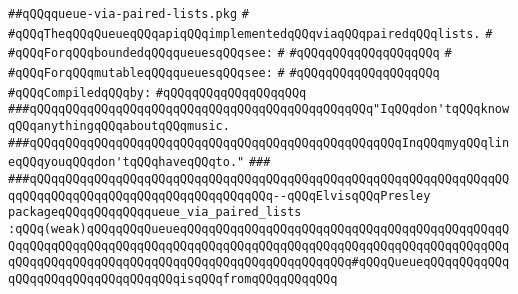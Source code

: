 \label{src/lib/src/queue-via-paired-lists.pkg}
\verb|##qQQqqueue-via-paired-lists.pkg|\newline
\verb|#|\newline
\verb|#qQQqTheqQQqQueueqQQqapiqQQqimplementedqQQqviaqQQqpairedqQQqlists.|\newline
\verb|#|\newline
\verb|#qQQqForqQQqboundedqQQqqueuesqQQqsee:|\newline
\verb|#|\newline
\verb|#qQQqqQQqqQQqqQQqqQQq|\newline
\verb|#|\newline
\verb|#qQQqForqQQqmutableqQQqqueuesqQQqsee:|\newline
\verb|#|\newline
\verb|#qQQqqQQqqQQqqQQqqQQq|\newline
\newline
\verb|#qQQqCompiledqQQqby:|\newline
\verb|#qQQqqQQqqQQqqQQqqQQq|\newline
\newline
\newline
\newline
\verb|###qQQqqQQqqQQqqQQqqQQqqQQqqQQqqQQqqQQqqQQqqQQqqQQq"IqQQqdon'tqQQqknowqQQqanythingqQQqaboutqQQqmusic.|\newline
\verb|###qQQqqQQqqQQqqQQqqQQqqQQqqQQqqQQqqQQqqQQqqQQqqQQqqQQqInqQQqmyqQQqlineqQQqyouqQQqdon'tqQQqhaveqQQqto."|\newline
\verb|###|\newline
\verb|###qQQqqQQqqQQqqQQqqQQqqQQqqQQqqQQqqQQqqQQqqQQqqQQqqQQqqQQqqQQqqQQqqQQqqQQqqQQqqQQqqQQqqQQqqQQqqQQqqQQqqQQq--qQQqElvisqQQqPresley|\newline
\newline
\newline
\newline
\verb|packageqQQqqQQqqQQqqueue_via_paired_lists|\newline
\verb|:qQQq(weak)qQQqqQQqQueueqQQqqQQqqQQqqQQqqQQqqQQqqQQqqQQqqQQqqQQqqQQqqQQqqQQqqQQqqQQqqQQqqQQqqQQqqQQqqQQqqQQqqQQqqQQqqQQqqQQqqQQqqQQqqQQqqQQqqQQqqQQqqQQqqQQqqQQqqQQqqQQqqQQqqQQqqQQqqQQqqQQq#qQQqQueueqQQqqQQqqQQqqQQqqQQqqQQqqQQqqQQqqQQqisqQQqfromqQQqqQQqqQQq|\newline
